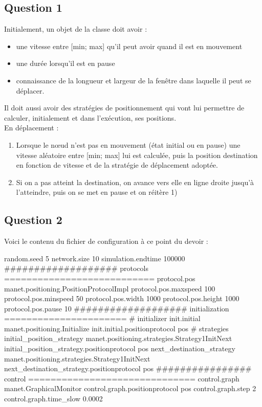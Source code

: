 \documentclass[10pt]{report}
\begin{document}
\subsection{Question 1}

Initialement, un objet de la classe doit avoir :
\begin{itemize}
\item une vitesse entre [min; max] qu'il peut avoir quand il est en mouvement
\item une durée lorsqu'il est en pause
\item connaissance de la longueur et largeur de la fenêtre dans laquelle il peut se déplacer.
\end{itemize}

Il doit aussi avoir des stratégies de positionnement qui vont lui permettre de calculer, initialement et dans l'exécution, ses positions.\\

En déplacement :
\begin{enumerate}
\item Lorsque le nœud n'est pas en mouvement (état initial ou en pause) une vitesse aléatoire entre [min; max] lui est calculée, puis la position destination en fonction de vitesse et de la stratégie de déplacement adoptée.
\item Si on a pas atteint la destination, on avance vers elle en ligne droite jusqu'à l'atteindre, puis on se met en pause et on réitère 1)
\end{enumerate}

\subsection{Question 2}
Voici le contenu du fichier de configuration à ce point du devoir :

\begin{boxedlisting}
random.seed 5
network.size 10
simulation.endtime 100000
################### protocols ===========================
protocol.pos manet.positioning.PositionProtocolImpl
protocol.pos.maxspeed 100
protocol.pos.minspeed 50
protocol.pos.width 1000
protocol.pos.height 1000
protocol.pos.pause 10
################### initialization ======================
# initializer
init.initial manet.positioning.Initialize
init.initial.positionprotocol pos
# strategies
initial_position_strategy manet.positioning.strategies.Strategy1InitNext
initial_position_strategy.positionprotocol pos
next_destination_strategy manet.positioning.strategies.Strategy1InitNext
next_destination_strategy.positionprotocol pos
################ control ==============================
control.graph manet.GraphicalMonitor
control.graph.positionprotocol pos
control.graph.step 2
control.graph.time_slow 0.0002
\end{boxedlisting}
\end{document}
